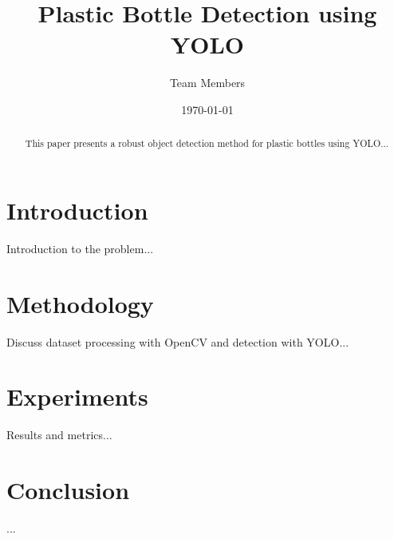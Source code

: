 \documentclass[12pt,a4paper]{article}
\title{Plastic Bottle Detection using YOLO}
\author{Team Members}
\date{\today}
\begin{document}
\maketitle

\begin{abstract}
This paper presents a robust object detection method for plastic bottles using YOLO...
\end{abstract}

\section{Introduction}
Introduction to the problem...

\section{Methodology}
Discuss dataset processing with OpenCV and detection with YOLO...

\section{Experiments}
Results and metrics...

\section{Conclusion}
...



\end{document}
